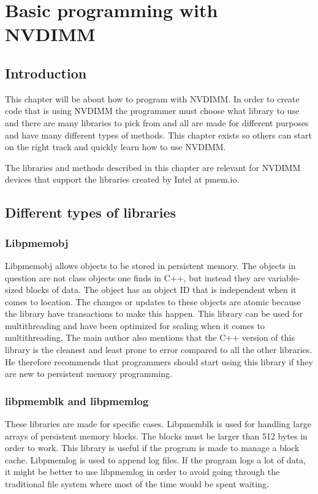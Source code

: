 \documentclass[12pt,a4paper,USenglish]{article}      %
\begin{document}
\clearpage
\section{Basic programming with NVDIMM}
\label{Chapter:Basicprogramming}
\subsection{Introduction}
This chapter will be about how to program with NVDIMM. In order to create code that is using NVDIMM the programmer must choose what library to use and there are many libraries to pick from and all are made for different purposes and have many different types of methods. This chapter exists so others can start on the right track and quickly learn how to use NVDIMM.

The libraries and methods described in this chapter are relevant for NVDIMM devices that support the libraries created by Intel at pmem.io.

\subsection{Different types of libraries}
\subsubsection{Libpmemobj}
Libpmemobj\cite{libpmemobj} allows objects to be stored in persistent memory. The objects in question are not class objects one finds in C++, but instead they are variable-sized blocks of data. The object has an object ID that is independent when it comes to location. The changes or updates to these objects are atomic because the library have transactions to make this happen. This library can be used for multithreading and have been optimized for scaling when it comes to multithreading. The main author also mentions that the C++ version of this library is the cleanest and least prone to error compared to all the other libraries\cite{Rudoff}. He therefore recommends that programmers should start using this library if they are new to persistent memory programming.

\subsubsection{libpmemblk and libpmemlog}
These libraries are made for specific cases. Libpmemblk\cite{libpmemblk} is used for handling large arrays of persistent memory blocks. The blocks must be larger than 512 bytes in order to work. This library is useful if the program is made to manage a block cache. Libpmemlog\cite{libpmemlog} is used to append log files. If the program logs a lot of data, it might be better to use libpmemlog in order to avoid going through the traditional file system where most of the time would be spent waiting.
\end{document}
